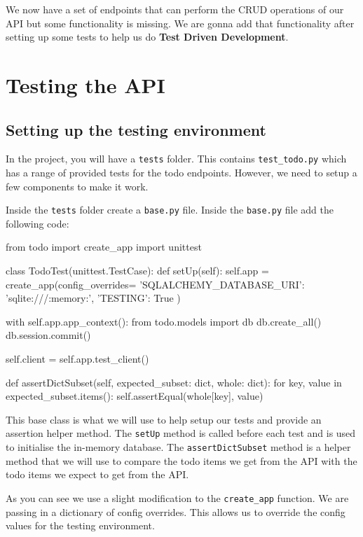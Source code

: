 \documentclass{csse4400}
\begin{document}
We now have a set of endpoints that can perform the CRUD operations of our API but some functionality is missing.
We are gonna add that functionality after setting up some tests to help us do \textbf{Test Driven Development}.

\section{Testing the API}

\subsection{Setting up the testing environment}

In the project, you will have a \texttt{tests} folder.
This contains \texttt{test\_todo.py} which has a range of provided tests for the todo endpoints.
However, we need to setup a few components to make it work.

Inside the \texttt{tests} folder create a \texttt{base.py} file. Inside the \texttt{base.py} file add the following code:

\begin{code}[language=python,numbers=none]{}
  from todo import create_app
  import unittest
  
  
  class TodoTest(unittest.TestCase):
      def setUp(self):
          self.app = create_app(config_overrides={
              'SQLALCHEMY_DATABASE_URI': 'sqlite:///:memory:',
              'TESTING': True
          })
  
          with self.app.app_context():
              from todo.models import db
              db.create_all()
              db.session.commit()
          
          self.client = self.app.test_client()
  
      def assertDictSubset(self, expected_subset: dict, whole: dict):
          for key, value in expected_subset.items():
              self.assertEqual(whole[key], value)
\end{code}


This base class is what we will use to help setup our tests and provide an assertion helper method.
The \texttt{setUp} method is called before each test and is used to initialise the in-memory database.
The \texttt{assertDictSubset} method is a helper method that we will use to compare the todo items we get from the API with the todo items we expect to get from the API.

As you can see we use a slight modification to the \texttt{create\_app} function.
We are passing in a dictionary of config overrides.
This allows us to override the config values for the testing environment.
\end{document}
